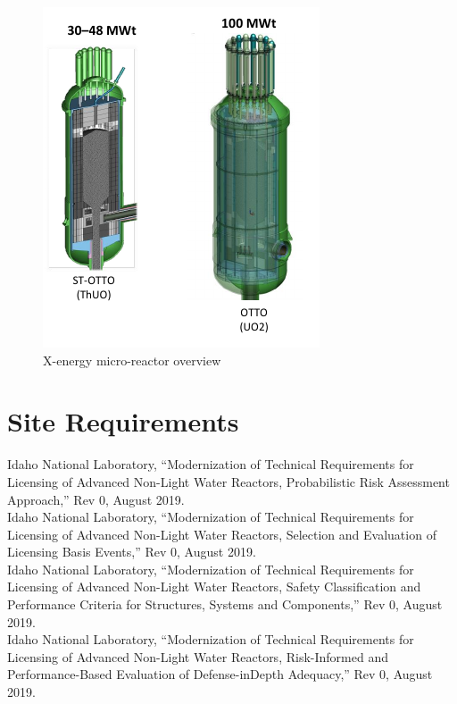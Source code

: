 \documentclass[10pt,a4paper]{article}
\begin{document}
\begin{figure}[hbtp]
\centering
\includegraphics[scale=1]{Figs/fig5.jpeg}
\caption{X-energy micro-reactor overview}
\end{figure}

\section{Site Requirements}
Idaho National Laboratory, “Modernization of Technical Requirements for Licensing of Advanced Non-Light Water Reactors, Probabilistic Risk Assessment Approach,” Rev 0, August 2019.\\ 
Idaho National Laboratory, “Modernization of Technical Requirements for Licensing of Advanced Non-Light Water Reactors, Selection and Evaluation of Licensing Basis Events,” Rev 0, August 2019.\\ 
Idaho National Laboratory, “Modernization of Technical Requirements for Licensing of Advanced Non-Light Water Reactors, Safety Classification and Performance Criteria for Structures, Systems and Components,” Rev 0, August 2019.\\ 
Idaho National Laboratory, “Modernization of Technical Requirements for Licensing of Advanced Non-Light Water Reactors, Risk-Informed and Performance-Based Evaluation of Defense-inDepth Adequacy,” Rev 0, August 2019.
\end{document}
